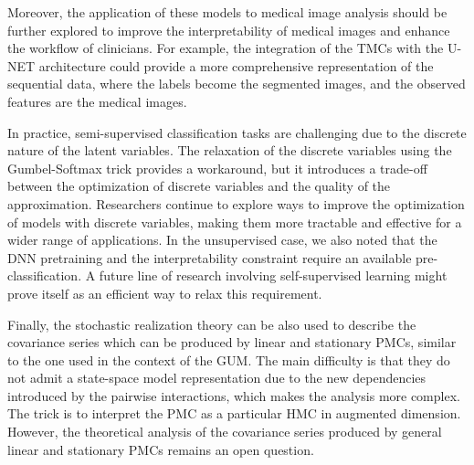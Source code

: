 Moreover, the application of these models to medical image analysis
should be further explored to improve the interpretability of medical images
and enhance the workflow of clinicians. For example, the integration of
the TMCs with the U-NET architecture could provide a more comprehensive
representation of the sequential data,  where the labels become the segmented images,
and the observed features are the medical images.
\vspace{0.27cm}

In practice, semi-supervised classification tasks are
challenging due to the discrete nature of the latent variables.
The relaxation of the discrete variables using the Gumbel-Softmax trick
provides a workaround, but it introduces a trade-off between the optimization
of discrete variables and the quality of the approximation.
Researchers continue to explore ways to improve the optimization of models with
discrete variables, making them more tractable and effective for a wider range
of applications.
In the unsupervised case, we also noted that the DNN pretraining and the
interpretability constraint require an available pre-classification. A future line
of research involving self-supervised learning might prove itself as an
efficient way to relax this requirement.

\vspace{0.27cm}

Finally, the stochastic realization theory can be also used to describe the
covariance series which can be produced by linear and stationary PMCs, similar
to the one used in the context of the GUM. The main difficulty is that they do
not admit a state-space model representation due to the new dependencies
introduced by the pairwise interactions, which makes the analysis more complex.
The trick is to interpret the PMC as a particular HMC in augmented dimension.
However, the theoretical analysis of the covariance series produced 
by general linear and stationary PMCs remains an open question.



